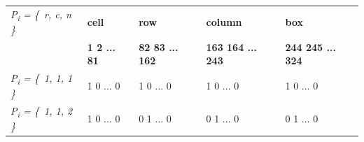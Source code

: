 \documentclass[a4paper,oneside,11pt]{report}
\newcounter{row}
\newcounter{col}
\begin{document}
\begin{tabular}{m{2.5cm} m{3cm} m{3cm} m{3cm} m{3cm}}
{\itshape P\textsubscript{i} = \{\ r, c, n \}} & \textbf{cell} & \textbf{row} & \textbf{column} & \textbf{box}\\ 
& \textbf{1\hspace{0.5cm} 2\hspace{0.5cm} ... \hspace{0.1cm}	81} & \textbf{82\hspace{0.2cm} 83\hspace{0.2cm} ... \hspace{0.3cm}	162} & \textbf{163\hspace{0.2cm} 164\hspace{0.1cm} ... \hspace{0.1cm}	243} & \textbf{244\hspace{0.2cm} 245\hspace{0.1cm} ... \hspace{0.3cm}	324}\\ 
{\itshape P\textsubscript{i} = \{\ 1, 1, 1 \}} & 1\hspace{0.5cm} 0\hspace{0.5cm} ... \hspace{0.2cm} 0 & 1\hspace{0.5cm} 0\hspace{0.3cm} ... \hspace{0.5cm} 0 & 1\hspace{0.7cm} 0\hspace{0.5cm} ... \hspace{0.3cm} 0 & 1\hspace{0.7cm} 0\hspace{0.5cm} ... \hspace{0.3cm} 0\\ 
{\itshape P\textsubscript{i} = \{\ 1, 1, 2 \}} & 1\hspace{0.5cm} 0\hspace{0.5cm} ... \hspace{0.2cm} 0 & 0\hspace{0.5cm} 1\hspace{0.3cm} ... \hspace{0.5cm} 0 & 0\hspace{0.7cm} 1\hspace{0.5cm} ... \hspace{0.3cm} 0 & 0\hspace{0.7cm} 1\hspace{0.5cm} ... \hspace{0.3cm} 0\\ 

\end{tabular}
\end{document}
